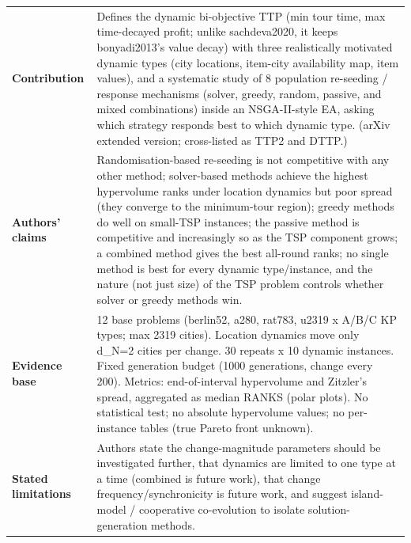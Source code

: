 \documentclass[
  a4paper,
  11pt,
  headings=small,
  numbers=noenddot,
  abstract=on,
  parskip=half,
]{scrartcl}
\begin{document}
\begin{landscape}
\begin{longtable}{@{}p{2.6cm}p{8.7cm}p{2.6cm}p{8.7cm}@{}}
\textbf{Contribution} & \multicolumn{3}{p{20.0cm}}{Defines the dynamic bi-objective TTP (min tour time, max time-decayed profit; unlike sachdeva2020, it keeps bonyadi2013's value decay) with three realistically motivated dynamic types (city locations, item-city availability map, item values), and a systematic study of 8 population re-seeding / response mechanisms (solver, greedy, random, passive, and mixed combinations) inside an NSGA-II-style EA, asking which strategy responds best to which dynamic type. (arXiv extended version; cross-listed as TTP2 and DTTP.)} \\
\textbf{Authors' claims} & \multicolumn{3}{p{20.0cm}}{Randomisation-based re-seeding is not competitive with any other method; solver-based methods achieve the highest hypervolume ranks under location dynamics but poor spread (they converge to the minimum-tour region); greedy methods do well on small-TSP instances; the passive method is competitive and increasingly so as the TSP component grows; a combined method gives the best all-round ranks; no single method is best for every dynamic type/instance, and the nature (not just size) of the TSP problem controls whether solver or greedy methods win.} \\
\textbf{Evidence base} & \multicolumn{3}{p{20.0cm}}{12 base problems (berlin52, a280, rat783, u2319 x A/B/C KP types; max 2319 cities). Location dynamics move only d\_N=2 cities per change. 30 repeats x 10 dynamic instances. Fixed generation budget (1000 generations, change every 200). Metrics: end-of-interval hypervolume and Zitzler's spread, aggregated as median RANKS (polar plots). No statistical test; no absolute hypervolume values; no per-instance tables (true Pareto front unknown).} \\
\textbf{Stated limitations} & \multicolumn{3}{p{20.0cm}}{Authors state the change-magnitude parameters should be investigated further, that dynamics are limited to one type at a time (combined is future work), that change frequency/synchronicity is future work, and suggest island-model / cooperative co-evolution to isolate solution-generation methods.} \\

\end{longtable}
\end{landscape}
\end{document}
